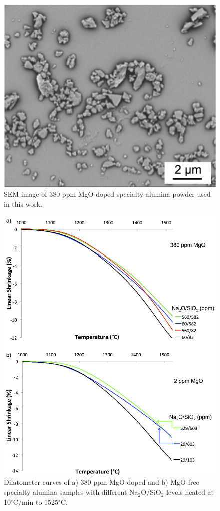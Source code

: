 \newpage
\begin{figure}[H]
	\centering
	\includegraphics[width=\textwidth]{Chapter-3/Figures/Figure1.png}
	\caption{SEM image of 380 ppm MgO-doped specialty alumina powder used in this work.}
	\label{Ch3-figure:Figure1}
\end{figure}

\newpage
\begin{figure}[H]
	\centering
	\includegraphics[width=\textwidth]{Chapter-3/Figures/Figure2.png}
	\caption{Dilatometer curves of a) 380 ppm MgO-doped and b) MgO-free \cite{Bae1997} specialty alumina samples with different Na$_{2}$O/SiO$_{2}$ levels heated at 10$^{\circ}$C/min to 1525$^{\circ}$C.}
	\label{Ch3-figure:Figure2}
\end{figure}

